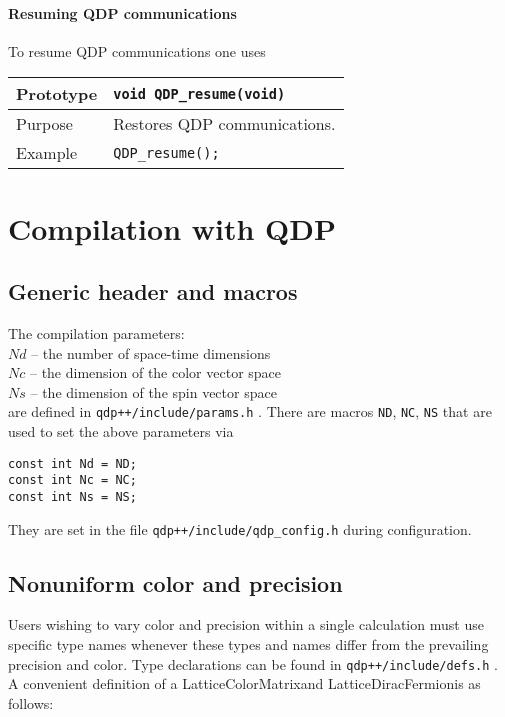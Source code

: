 \documentclass[12pt,letterpaper]{article}
\newcommand{\tLatticeColorMatrix}{LatticeColorMatrix}
\newcommand{\tLatticeDiracFermion}{LatticeDiracFermion}
\begin{document}
\paragraph{Resuming QDP communications}

To resume QDP communications one uses
\begin{flushleft}
\begin{tabular}{|l|l|}
  \hline
  Prototype      & \verb|void QDP_resume(void)| \\
\hline
Purpose        & Restores QDP communications. \\
\hline
Example  & \verb|QDP_resume();| \\
\hline
  \end{tabular}
\end{flushleft}

\newpage

\section{Compilation with QDP}

\subsection{Generic header and macros}

The compilation parameters:\\
\noindent
$Nd$ -- the number of space-time dimensions\\
\noindent
$Nc$ -- the dimension of the color vector space\\
\noindent
$Ns$ -- the dimension of the spin vector space\\
\noindent
are defined in {\tt qdp++/include/params.h} . 
There are macros {\tt ND}, {\tt NC},
{\tt NS} that are used to set the above parameters via
\begin{verbatim}
const int Nd = ND;
const int Nc = NC;
const int Ns = NS;
\end{verbatim}
%
\noindent
They are set in the file {\tt qdp++/include/qdp\_config.h} 
during configuration.

\subsection{Nonuniform color and precision}

Users wishing to vary color and precision within a single calculation
must use specific type names whenever these types
and names differ from the prevailing precision and color. 
Type declarations can be found in {\tt qdp++/include/defs.h} . A convenient
definition of a \tLatticeColorMatrix and \tLatticeDiracFermion is as follows:
\end{document}
